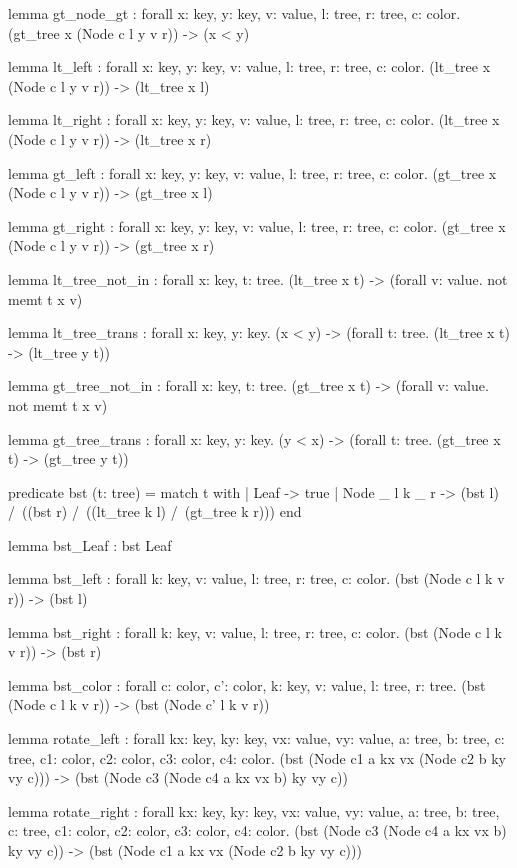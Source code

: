 \begin{whylang}
  lemma gt_node_gt : forall x: key, y: key, v: value, l: tree, r: tree, c: color. (gt_tree x (Node c l y v r)) -> (x < y)

  lemma lt_left : forall x: key, y: key, v: value, l: tree, r: tree, c: color. (lt_tree x (Node c l y v r)) -> (lt_tree x l)

  lemma lt_right : forall x: key, y: key, v: value, l: tree, r: tree, c: color. (lt_tree x (Node c l y v r)) -> (lt_tree x r)

  lemma gt_left : forall x: key, y: key, v: value, l: tree, r: tree, c: color. (gt_tree x (Node c l y v r)) -> (gt_tree x l)

  lemma gt_right : forall x: key, y: key, v: value, l: tree, r: tree, c: color. (gt_tree x (Node c l y v r)) -> (gt_tree x r)

  lemma lt_tree_not_in : forall x: key, t: tree. (lt_tree x t) -> (forall v: value. not memt t x v)

  lemma lt_tree_trans : forall x: key, y: key. (x < y) -> (forall t: tree. (lt_tree x t) -> (lt_tree y t))

  lemma gt_tree_not_in : forall x: key, t: tree. (gt_tree x t) -> (forall v: value. not memt t x v)

  lemma gt_tree_trans : forall x: key, y: key. (y < x) -> (forall t: tree. (gt_tree x t) -> (gt_tree y t))

  predicate bst (t: tree) =
 match t with
 | Leaf -> true
 | Node _ l k _ r -> (bst l) /\ ((bst r) /\ ((lt_tree k l) /\ (gt_tree k r)))
  end

  lemma bst_Leaf : bst Leaf

  lemma bst_left : forall k: key, v: value, l: tree, r: tree, c: color. (bst (Node c l k v r)) -> (bst l)

  lemma bst_right : forall k: key, v: value, l: tree, r: tree, c: color. (bst (Node c l k v r)) -> (bst r)

  lemma bst_color : forall c: color, c': color, k: key, v: value, l: tree, r: tree. (bst (Node c l k v r)) -> (bst (Node c' l k v r))

  lemma rotate_left : forall kx: key, ky: key, vx: value, vy: value, a: tree, b: tree, c: tree, c1: color, c2: color, c3: color, c4: color. (bst (Node c1 a kx vx (Node c2 b ky vy c))) -> (bst (Node c3 (Node c4 a kx vx b) ky vy c))

  lemma rotate_right : forall kx: key, ky: key, vx: value, vy: value, a: tree, b: tree, c: tree, c1: color, c2: color, c3: color, c4: color. (bst (Node c3 (Node c4 a kx vx b) ky vy c)) -> (bst (Node c1 a kx vx (Node c2 b ky vy c)))


\end{whylang}
